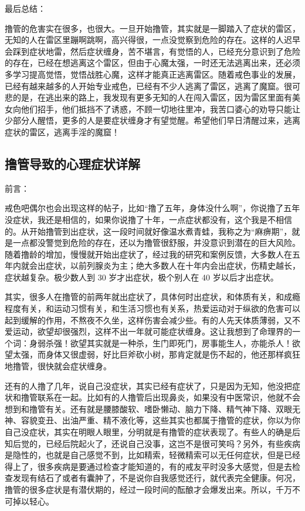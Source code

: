 最后总结：

撸管的危害实在很多，也很大。一旦开始撸管，其实就是一脚踏入了症状的雷区，无知的人在雷区里蹦啊跳啊，高兴得很，一点没觉察到危险的存在。这样的人迟早会踩到症状地雷，然后症状缠身，苦不堪言，有觉悟的人，已经充分意识到了危险的存在，已经在想逃离这个雷区，但由于心魔太强，一时还无法逃离出来，还必须多学习提高觉悟，觉悟战胜心魔，这样才能真正逃离雷区。随着戒色事业的发展，已经有越来越多的人开始专业戒色，已经有不少人逃离了雷区，逃离了魔窟。很可悲的是，在逃出来的路上，我发现有更多无知的人在闯入雷区，因为雷区里面有美女向他们招手，他们抵挡不了诱惑，不顾一切地往里冲，我苦口婆心的劝导只能让少部分人醒悟，更多的人是要症状缠身才有望觉醒。希望他们早日清醒过来，逃离症状的雷区，逃离手淫的魔窟！

\subsection{撸管导致的心理症状详解}

前言：

戒色吧偶尔也会出现这样的帖子，比如“撸了五年，身体没什么啊”，你说撸了五年没症状，我还是相信的，如果你说撸了十年，一点症状都没有，这个我是不相信的。从开始撸管到出症状，这一段时间就好像温水煮青蛙，我称之为“麻痹期”，就是一点都没警觉到危险的存在，还以为撸管很舒服，并没意识到潜在的巨大风险。随着撸龄的增加，慢慢就开始出症状了，经过我的研究和案例反馈，大多数人在五年内就会出症状，以前列腺炎为主；绝大多数人在十年内会出症状，伤精史越长，症状越复杂。极少数人到 30 岁才出症状，极个别人在 40 岁以后才出症状。

其实，很多人在撸管的前两年就出症状了，具体何时出症状，和体质有关，和成瘾程度有关，和运动习惯有关，和生活习惯也有关系，热爱运动对于纵欲的危害可以起到缓解的作用，不熬夜不久坐，这样伤害会减少些。有的人先天体质薄弱，又不爱运动，欲望却很强烈，这样不出一年就可能症状缠身。这让我想到了命理界的一个词：身弱杀强！欲望其实就是一种杀，生门即死门，房事能生人，亦能杀人！欲望太强，而身体又很虚弱，好比巨斧砍小树，那肯定就是伤不起的，他还那样疯狂地撸管，很快就会症状缠身。

还有的人撸了几年，说自己没症状，其实已经有症状了，只是因为无知，他没把症状和撸管联系在一起。比如有的人撸管后出现鼻炎，如果没有中医常识，他就不会想到和撸管有关。还有就是腰膝酸软、嗜卧懒动、脑力下降、精气神下降、双眼无神、容貌变丑、出油严重、精不液化等，这些其实也都属于撸管的症状，你以为你自己没症状，其实在明眼人眼里，分明就是有撸管的症状表现了。有些人的确是后知后觉的，已经后院起火了，还说自己没事，这岂不是很可笑吗？另外，有些疾病是隐性的，也就是自己感觉不到，比如精索，轻微精索可以无任何症状，但是已经得上了，很多疾病是要通过检查才能知道的，有的戒友平时没多大感觉，但是去检查发现有结石了或者有囊肿了，不是说你自我感觉还行，就代表完全健康。何况，撸管的很多症状是有潜伏期的，经过一段时间的酝酿才会爆发出来。所以，千万不可掉以轻心。

